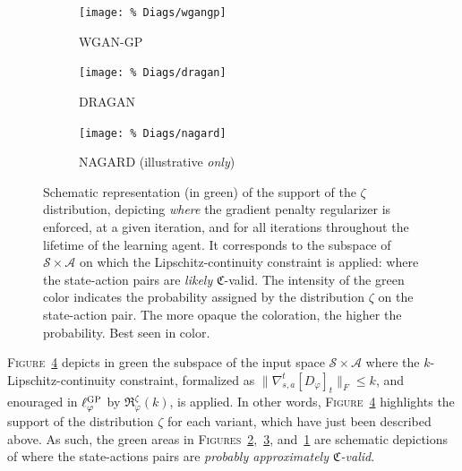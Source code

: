 \begin{figure}
\centering
\begin{subfigure}[t]{0.38\textwidth}
\centering
\texttt{[image: \%
Diags/wgangp]}
\caption{WGAN-GP \cite{Gulrajani2017-mr}}
\label{wgangp}
\end{subfigure}
\begin{subfigure}[t]{0.30\textwidth}
\centering
\texttt{[image: \%
Diags/dragan]}
\caption{DRAGAN \cite{Kodali2017-xt}}
\label{dragan}
\end{subfigure}
\begin{subfigure}[t]{0.30\textwidth}
\centering
\texttt{[image: \%
Diags/nagard]}
\caption{NAGARD (illustrative \emph{only})}
\label{nagard}
\end{subfigure}
\caption{Schematic representation (in green) of the support of the $\zeta$ distribution,
depicting \emph{where} the gradient penalty regularizer is enforced, at a given iteration,
and for all iterations throughout the lifetime of the learning agent.
It corresponds to the subspace of $\mathcal{S} \times \mathcal{A}$
on which the Lipschitz-continuity constraint is applied:
where the state-action pairs are \emph{likely} $\mathfrak{C}$-valid.
The intensity of the green color indicates the probability assigned by the distribution
$\zeta$ on the state-action pair. The more opaque the coloration, the higher the probability.
Best seen in color.}
\label{gpvariants}
\end{figure}

\textsc{Figure}~\ref{gpvariants} depicts in green the subspace of the input space
$\mathcal{S} \times \mathcal{A}$ where the $k$-Lipschitz-continuity constraint,
formalized as $\lVert \nabla_{s,a}^t[D_\varphi]_t \rVert _F \leq k$, and enouraged
in $\ell_\varphi^\textsc{GP}$ by $\mathfrak{R}_\varphi^\zeta (k)$,
is applied.
In other words, \textsc{Figure}~\ref{gpvariants} highlights the support of the distribution $\zeta$ for each variant,
which have just been described above.
As such, the green areas in \textsc{Figures}~\ref{dragan},~\ref{nagard}, and~\ref{wgangp}
are schematic depictions of where the state-actions pairs are \emph{probably approximately $\mathfrak{C}$-valid}.

